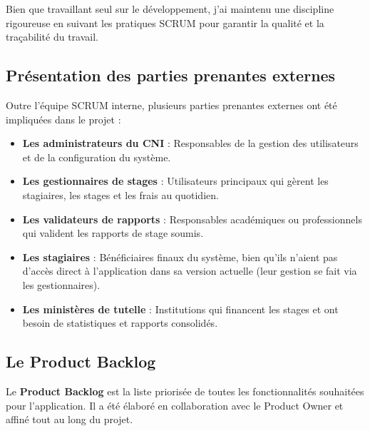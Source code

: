 \documentclass[12pt,a4paper]{report}
\begin{document}
Bien que travaillant seul sur le développement, j'ai maintenu une discipline rigoureuse en suivant les pratiques SCRUM pour garantir la qualité et la traçabilité du travail.

\subsection{Présentation des parties prenantes externes}

Outre l'équipe SCRUM interne, plusieurs parties prenantes externes ont été impliquées dans le projet :

\begin{itemize}[leftmargin=1cm]
    \item \textbf{Les administrateurs du CNI} : Responsables de la gestion des utilisateurs et de la configuration du système.
    
    \item \textbf{Les gestionnaires de stages} : Utilisateurs principaux qui gèrent les stagiaires, les stages et les frais au quotidien.
    
    \item \textbf{Les validateurs de rapports} : Responsables académiques ou professionnels qui valident les rapports de stage soumis.
    
    \item \textbf{Les stagiaires} : Bénéficiaires finaux du système, bien qu'ils n'aient pas d'accès direct à l'application dans sa version actuelle (leur gestion se fait via les gestionnaires).
    
    \item \textbf{Les ministères de tutelle} : Institutions qui financent les stages et ont besoin de statistiques et rapports consolidés.
\end{itemize}

\subsection{Le Product Backlog}

Le \textbf{Product Backlog} est la liste priorisée de toutes les fonctionnalités souhaitées pour l'application. Il a été élaboré en collaboration avec le Product Owner et affiné tout au long du projet.
\end{document}
